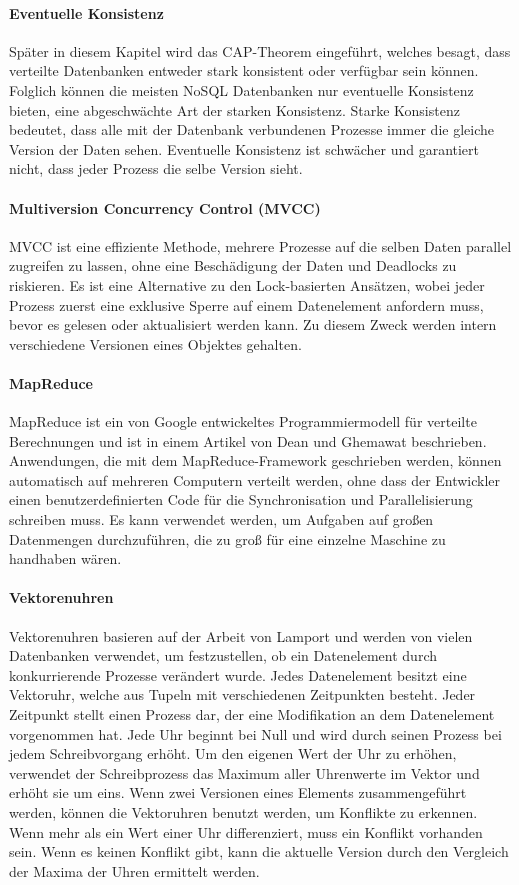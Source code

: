 \paragraph{Eventuelle Konsistenz} Später in diesem Kapitel wird das CAP-Theorem eingeführt, welches besagt, dass verteilte Datenbanken entweder stark konsistent oder verfügbar sein können. Folglich können die meisten NoSQL Datenbanken nur eventuelle Konsistenz bieten, eine abgeschwächte Art der starken Konsistenz. Starke Konsistenz bedeutet, dass alle mit der Datenbank verbundenen Prozesse immer die gleiche Version der Daten sehen. Eventuelle Konsistenz ist schwächer und garantiert nicht, dass jeder Prozess die selbe Version sieht.

\paragraph{Multiversion Concurrency Control (MVCC)} MVCC ist eine effiziente Methode, mehrere Prozesse auf die selben Daten parallel zugreifen zu lassen, ohne eine Beschädigung der Daten und Deadlocks zu riskieren. Es ist eine Alternative zu den Lock-basierten Ansätzen, wobei jeder Prozess zuerst eine exklusive Sperre auf einem Datenelement anfordern muss, bevor es gelesen oder aktualisiert werden kann. Zu diesem Zweck werden intern verschiedene Versionen eines Objektes gehalten.

\paragraph{MapReduce} MapReduce ist ein von Google entwickeltes Programmiermodell für verteilte Berechnungen und ist in einem Artikel von Dean und Ghemawat \cite{Dean:2008:MSD:1327452.1327492} beschrieben. Anwendungen, die mit dem MapReduce-Framework geschrieben werden, können automatisch auf mehreren Computern verteilt werden, ohne dass der Entwickler einen benutzerdefinierten Code für die Synchronisation und Parallelisierung schreiben muss. Es kann verwendet werden, um Aufgaben auf großen Datenmengen durchzuführen, die zu groß für eine einzelne Maschine zu handhaben wären.

\paragraph{Vektorenuhren }
Vektorenuhren  basieren auf der Arbeit von Lamport \cite{Lamport:1978:TCO:359545.359563} und werden von vielen Datenbanken verwendet, um festzustellen, ob ein Datenelement durch konkurrierende Prozesse verändert wurde. Jedes Datenelement besitzt eine Vektoruhr, welche aus Tupeln mit verschiedenen Zeitpunkten besteht. Jeder Zeitpunkt stellt einen Prozess dar, der eine Modifikation an dem Datenelement vorgenommen hat. Jede Uhr beginnt bei Null und wird durch seinen Prozess bei jedem Schreibvorgang erhöht. Um den eigenen Wert der Uhr zu erhöhen, verwendet der Schreibprozess das Maximum aller Uhrenwerte im Vektor und erhöht sie um eins. Wenn zwei Versionen eines Elements zusammengeführt werden, können die Vektoruhren benutzt werden, um Konflikte zu erkennen. Wenn mehr als ein Wert einer Uhr differenziert, muss ein Konflikt vorhanden sein. Wenn es keinen Konflikt gibt, kann die aktuelle Version durch den Vergleich der Maxima der Uhren ermittelt werden.

